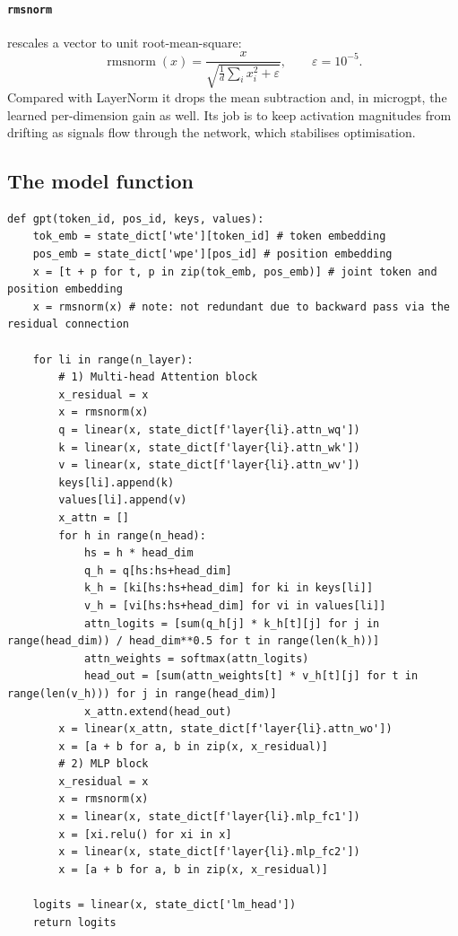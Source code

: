 \documentclass[11pt,letterpaper]{article}
\theoremstyle{remark}
\newcommand{\code}[1]{\lstinline[basicstyle=\ttfamily\small]|#1|}
\newcommand{\rmsnorm}{\operatorname{rmsnorm}}
\begin{document}
\paragraph{\code{rmsnorm}} \parencite{zhang2019rmsnorm} rescales a vector to unit root-mean-square:
\begin{equation}
\rmsnorm(x) = \frac{x}{\sqrt{\tfrac1d\sum_i x_i^2 + \varepsilon}},\qquad \varepsilon = 10^{-5}.
\end{equation}
Compared with LayerNorm \parencite{ba2016layernorm} it drops the mean subtraction and, in microgpt, the learned per-dimension gain as well. Its job is to keep activation magnitudes from drifting as signals flow through the network, which stabilises optimisation.

\subsection{The model function}

\begin{lstlisting}
def gpt(token_id, pos_id, keys, values):
    tok_emb = state_dict['wte'][token_id] # token embedding
    pos_emb = state_dict['wpe'][pos_id] # position embedding
    x = [t + p for t, p in zip(tok_emb, pos_emb)] # joint token and position embedding
    x = rmsnorm(x) # note: not redundant due to backward pass via the residual connection

    for li in range(n_layer):
        # 1) Multi-head Attention block
        x_residual = x
        x = rmsnorm(x)
        q = linear(x, state_dict[f'layer{li}.attn_wq'])
        k = linear(x, state_dict[f'layer{li}.attn_wk'])
        v = linear(x, state_dict[f'layer{li}.attn_wv'])
        keys[li].append(k)
        values[li].append(v)
        x_attn = []
        for h in range(n_head):
            hs = h * head_dim
            q_h = q[hs:hs+head_dim]
            k_h = [ki[hs:hs+head_dim] for ki in keys[li]]
            v_h = [vi[hs:hs+head_dim] for vi in values[li]]
            attn_logits = [sum(q_h[j] * k_h[t][j] for j in range(head_dim)) / head_dim**0.5 for t in range(len(k_h))]
            attn_weights = softmax(attn_logits)
            head_out = [sum(attn_weights[t] * v_h[t][j] for t in range(len(v_h))) for j in range(head_dim)]
            x_attn.extend(head_out)
        x = linear(x_attn, state_dict[f'layer{li}.attn_wo'])
        x = [a + b for a, b in zip(x, x_residual)]
        # 2) MLP block
        x_residual = x
        x = rmsnorm(x)
        x = linear(x, state_dict[f'layer{li}.mlp_fc1'])
        x = [xi.relu() for xi in x]
        x = linear(x, state_dict[f'layer{li}.mlp_fc2'])
        x = [a + b for a, b in zip(x, x_residual)]

    logits = linear(x, state_dict['lm_head'])
    return logits
\end{lstlisting}
\end{document}
